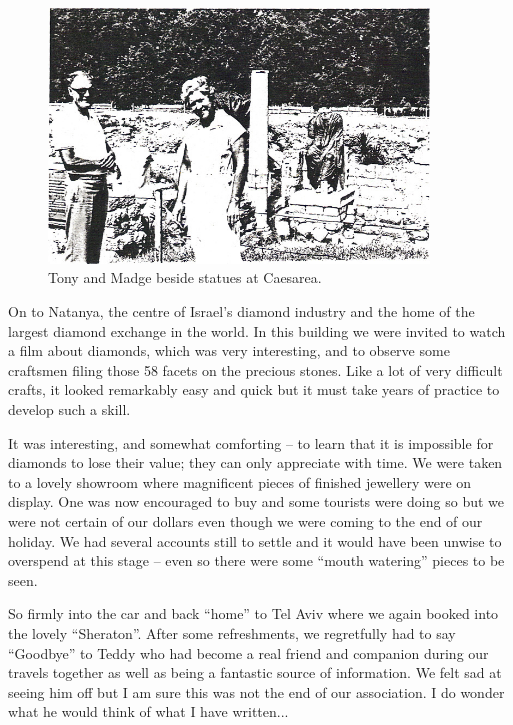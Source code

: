 \begin{figure}
  \centering
  \includegraphics[width=0.9\textwidth]{photos/israel5}
  \caption{Tony and Madge beside statues at Caesarea.}
  \label{israel5}
\end{figure}

On to Natanya, the centre of Israel's diamond industry and the home of
the largest diamond exchange in the world. In this building we were
invited to watch a film about diamonds, which was very interesting,
and to observe some craftsmen filing those 58 facets on the precious
stones. Like a lot of very difficult crafts, it looked remarkably easy
and quick but it must take years of practice to develop such a skill.

It was interesting, and somewhat comforting -- to learn that it is
impossible for diamonds to lose their value; they can only appreciate
with time. We were taken to a lovely showroom where magnificent pieces
of finished jewellery were on display. One was now encouraged to buy
and some tourists were doing so but we were not certain of our dollars
even though we were coming to the end of our holiday. We had several
accounts still to settle and it would have been unwise to overspend at
this stage -- even so there were some ``mouth watering'' pieces to be
seen.

So firmly into the car and back ``home'' to Tel Aviv where we again
booked into the lovely ``Sheraton''. After some refreshments, we
regretfully had to say ``Goodbye'' to Teddy who had become a real
friend and companion during our travels together as well as being a
fantastic source of information. We felt sad at seeing him off but I
am sure this was not the end of our association. I do wonder what he
would think of what I have written...


